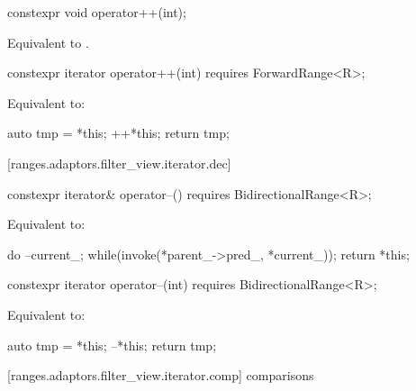 %
\begin{itemdecl}
constexpr void operator++(int);
\end{itemdecl}

\begin{itemdescr}
\pnum
\effects Equivalent to .
\end{itemdescr}

%
\begin{itemdecl}
constexpr iterator operator++(int) requires ForwardRange<R>;
\end{itemdecl}

\begin{itemdescr}
\pnum
\effects Equivalent to:
\begin{codeblock}
auto tmp = *this;
++*this;
return tmp;
\end{codeblock}
\end{itemdescr}

[ranges.adaptors.filter_view.iterator.dec]{}

%
\begin{itemdecl}
constexpr iterator& operator--() requires BidirectionalRange<R>;
\end{itemdecl}

\begin{itemdescr}
\pnum
\effects Equivalent to:
\begin{codeblock}
do
--current_;
while(invoke(*parent_->pred_, *current_));
return *this;
\end{codeblock}
\end{itemdescr}

%
\begin{itemdecl}
constexpr iterator operator--(int) requires BidirectionalRange<R>;
\end{itemdecl}

\begin{itemdescr}
\pnum
\effects Equivalent to:
\begin{codeblock}
auto tmp = *this;
--*this;
return tmp;
\end{codeblock}
\end{itemdescr}

[ranges.adaptors.filter_view.iterator.comp]{ comparisons}

